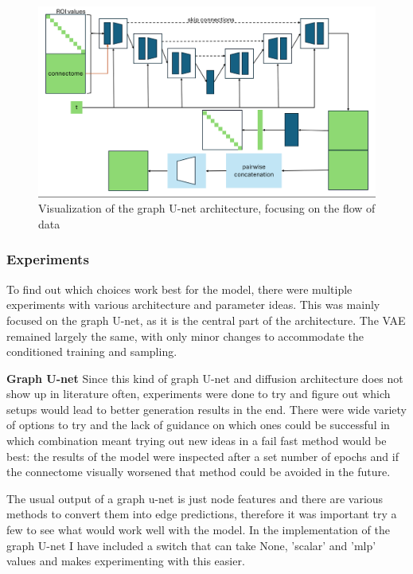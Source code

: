 	\begin{figure}[!h]
		\centering
		\includegraphics[width=\textwidth]{figures/own_gunet.png}
		\caption{Visualization of the graph U-net architecture, focusing on the flow of data}
	\end{figure}
	
	
	\subsubsection{Experiments}
	
	To find out which choices work best for the model, there were multiple experiments with various architecture and parameter ideas. This was mainly focused on the graph U-net, as it is the central part of the architecture. The VAE remained largely the same, with only minor changes to accommodate the conditioned training and sampling.

	\textbf{Graph U-net} Since this kind of graph U-net and diffusion architecture does not show up in literature often, experiments were done to try and figure out which setups would lead to better generation results in the end. There were wide variety of options to try and the lack of guidance on which ones could be successful in which combination meant trying out new ideas in a fail fast method would be best: the results of the model were inspected after a set number of epochs and if the connectome visually worsened that method could be avoided in the future.
	
	The usual output of a graph u-net is just node features and there are various methods to convert them into edge predictions\cite{li2023evaluating}, therefore it was important try a few to see what would work well with the model. In the implementation of the graph U-net I have included a switch that can take None, ’scalar’ and ’mlp’ values and makes experimenting with this easier. 
	
